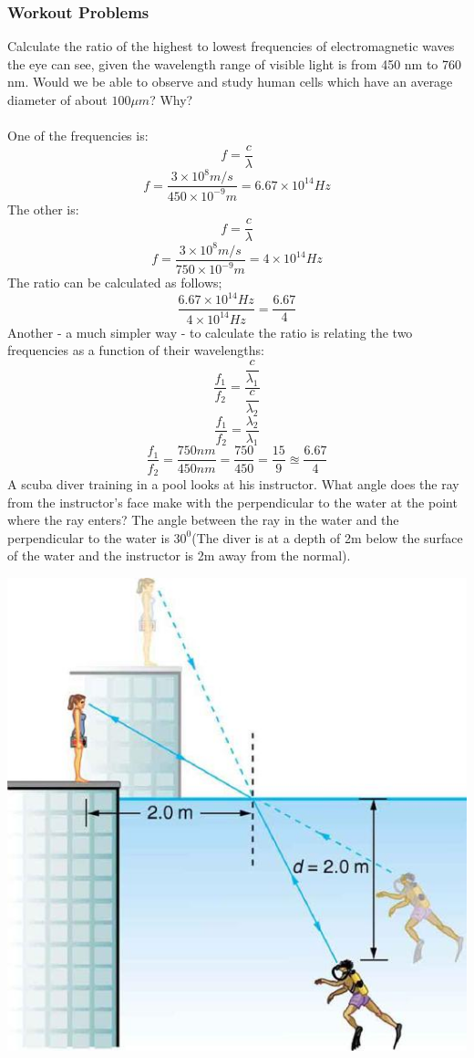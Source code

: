 \documentclass[12pt,addpoints]{exam}
\begin{document}
{{{\begin{questions}
					\subsubsection*{Workout Problems}
					\question Calculate the ratio of the highest to lowest frequencies of electromagnetic waves the eye can see, given the wavelength range of visible light is from 450 nm to 760 nm. Would we be able to observe and study human cells  which have an average diameter of about $100\mu m$? Why? \\ \\
					One of the frequencies is:
					$$f=\dfrac{c}{\lambda}$$
					$$f=\dfrac{3\times10^8m/s}{450\times10^{-9}m}=6.67\times10^{14}Hz$$
					The other is:
					$$f=\dfrac{c}{\lambda}$$
					$$f=\dfrac{3\times10^8m/s}{750\times10^{-9}m}=4\times10^{14}Hz$$
					The ratio can be calculated as follows;
					$$\dfrac{6.67\times10^{14}Hz}{4\times10^{14}Hz}=\dfrac{6.67}{4}$$
					Another - a much simpler way - to calculate the ratio is relating the two frequencies as a function of their wavelengths:
					$$\dfrac{f_1}{f_2}=\dfrac{\dfrac{c}{\lambda_1}}{\dfrac{c}{\lambda_2}}$$
					$$\dfrac{f_1}{f_2}=\dfrac{\lambda_2}{\lambda_1}$$
					$$\dfrac{f_1}{f_2}=\dfrac{750nm}{450nm}=\dfrac{750}{450}=\dfrac{15}{9}\approxeq\dfrac{6.67}{4}$$
					\question A scuba diver training in a pool looks at his instructor. What angle does the ray from the instructor’s face make with the perpendicular to the water at the point where the ray enters? The angle between the ray in the water and the perpendicular to the water is $30^0$(The diver is at a depth of 2m below the surface of the water and the instructor is 2m away from the normal).
					\begin{center}
						\includegraphics[scale=0.3]{1}

\end{center}
\end{questions}}}}
\end{document}
